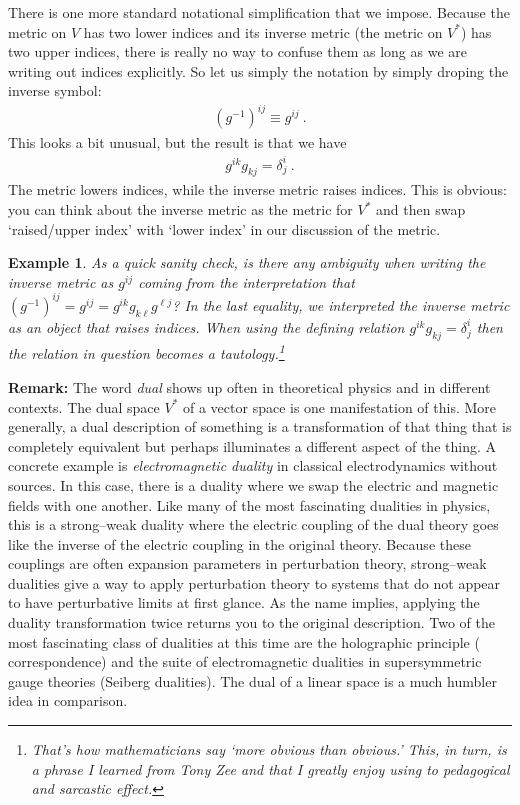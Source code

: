\documentclass[
  11pt,
	colorful,
	raggedright,
]{tufte-style-thesis-flip}
\newtheorem{example}{Example}[section]
\begin{document}
There is one more standard notational simplification that we impose. Because the metric on $V$ has two lower indices and its inverse metric (the metric on $V^*$) has two upper indices, there is really no way to confuse them as long as we are writing out indices explicitly. So let us simply the notation by simply droping the inverse symbol:
\begin{align}
  (g^{-1})^{ij} \equiv g^{ij} \ .
\end{align}
This looks a bit unusual, but the result is that we have
\begin{align}
  g^{ik}g_{kj} = \delta^i_j \ .
\end{align}
The metric lowers indices, while the inverse metric raises indices. This is obvious: you can think about the inverse metric as the metric for $V^*$ and then swap `raised/upper index' with `lower index' in our discussion of the metric.
\begin{example}
As a quick sanity check, is there any ambiguity when writing the inverse metric as $g^{ij}$ coming from the interpretation that $(g^{-1})^{ij} =g^{ij} = g^{ik}g_{k\ell}g^{\ell j}$? In the last equality, we interpreted the inverse metric as an object that raises indices. When using the defining relation $g^{ik}g_{kj} = \delta^i_j$ then the relation in question becomes a tautology.\footnote{That's how mathematicians say `more obvious than obvious.' This, in turn, is a phrase I learned from Tony Zee and that I greatly enjoy using to pedagogical and sarcastic effect.}
\end{example}


\begin{framed}
\noindent \textbf{Remark:}
The word \emph{dual} shows up often in theoretical physics and in different contexts. The dual space $V^*$ of a vector space is one manifestation of this. More generally, a dual description of something is a transformation of that thing that is completely equivalent but perhaps illuminates a different aspect of the thing. A concrete example is \emph{electromagnetic duality} in classical electrodynamics without sources. In this case, there is a duality where we swap the electric and magnetic fields with one another. Like many of the most fascinating dualities in physics, this is a strong--weak duality where the electric coupling of the dual theory goes like the inverse of the electric coupling in the original theory. Because these couplings are often expansion parameters in perturbation theory, strong--weak dualities give a way to apply perturbation theory to systems that do not appear to have perturbative limits at first glance. As the name implies, applying the duality transformation twice returns you to the original description. Two of the most fascinating class of dualities at this time are the holographic principle ( correspondence) and the suite of electromagnetic dualities in supersymmetric gauge theories (Seiberg dualities). The dual of a linear space is a much humbler idea in comparison.
\end{framed}
\end{document}
